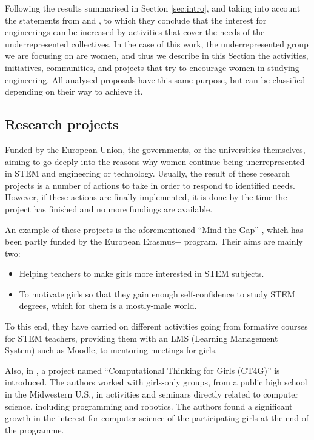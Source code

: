 \documentclass[journal,transmag]{IEEEtran}
\begin{document}
Following the results summarised in Section \ref{sec:intro}, and taking into account the statements from \cite{everis2012} and \cite{molina2010perception}, to which they conclude that the interest for engineerings can be increased by activities that cover the needs of the underrepresented collectives. In the case of this work, the underrepresented group we are focusing on are women, and thus we describe in this Section the activities, initiatives, communities, and projects that try to encourage women in studying engineering. All analysed proposals have this same purpose, but can be classified depending on their way to achieve it.

\subsection{Research projects}

Funded by the European Union, the governments, or the universities themselves, aiming to go deeply into the reasons why women continue being unerrepresented in STEM and engineering or technology. Usually, the result of these research projects is a number of actions to take in order to respond to identified needs. However, if these actions are finally implemented, it is done by the time the project has finished and no more fundings are available.

An example of these projects is the aforementioned ``Mind the Gap'' \cite{mtg:site}, which has been partly funded by the European Erasmus+ program. Their aims are mainly two:

\begin{itemize}
  \item Helping teachers to make girls more interested in STEM subjects.
  \item To motivate girls so that they gain enough self-confidence to study STEM degrees, which for them is a mostly-male world.
\end{itemize}

To this end, they have carried on different activities going from formative courses for STEM teachers, providing them with an LMS (Learning Management System) such as Moodle, to mentoring meetings for girls.

Also, in \cite{brady2016all}, a project named ``Computational Thinking for Girls (CT4G)'' is introduced. The authors worked with girls-only groups, from a public high school in the Midwestern U.S., in activities and seminars directly related to computer science, including programming and robotics. The authors found a significant growth in the interest for computer science of the participating girls at the end of the programme.
\end{document}
